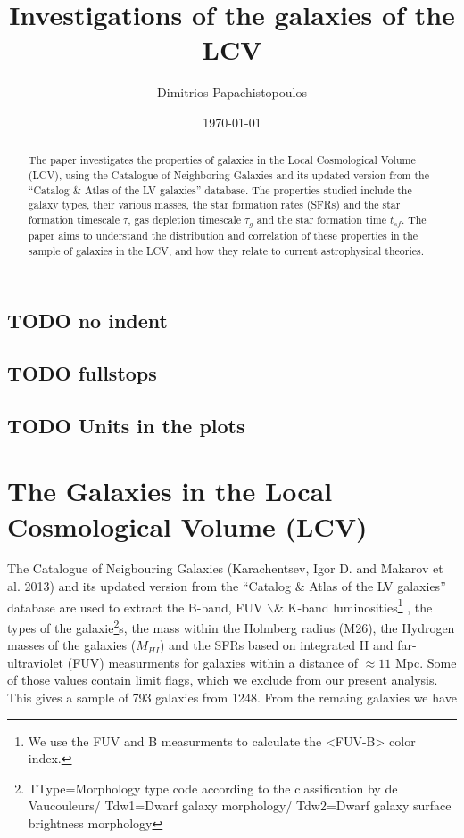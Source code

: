 \documentclass[a4paper,twocolumn]{article}
\author{Dimitrios Papachistopoulos}
\date{\today}
\title{Investigations of the galaxies of the LCV}
\begin{document}
\maketitle

\subsection{{\bfseries\sffamily TODO} no indent}
\label{sec:org4ae1c6d}
\subsection{{\bfseries\sffamily TODO} fullstops}
\label{sec:orge244364}
\subsection{{\bfseries\sffamily TODO} Units in the plots}
\label{sec:orgaf69437}

\begin{abstract}
The paper investigates the properties of galaxies in the Local Cosmological Volume (LCV), using the Catalogue of Neighboring Galaxies\autocite{karachentsevUPDATEDNEARBYGALAXY2013} and its updated version from the ``Catalog \& Atlas of the LV galaxies'' database\autocite{CatalogLVGalaxies}. The properties studied include the galaxy types, their various masses, the star formation rates (SFRs) and the star formation timescale \(\tau\), gas depletion timescale \(\tau_g\) and the star formation time \(t_{sf}\). The paper aims to understand the distribution and correlation of these properties in the sample of galaxies in the LCV, and how they relate to current astrophysical theories.
\end{abstract}

\section{The Galaxies in the Local Cosmological Volume (LCV)}
\label{sec:org94f634b}

The Catalogue of Neigbouring Galaxies (Karachentsev, Igor D. and Makarov  et al. 2013\autocite{karachentsevUPDATEDNEARBYGALAXY2013}) and its updated version from the ``Catalog \& Atlas of the LV galaxies'' database\autocite{CatalogLVGalaxies}  are used to extract the B-band, FUV $\backslash$& K-band luminosities\footnote{We use the FUV and B measurments to calculate the <FUV-B> color index.} , the types of the galaxie\footnote{TType=Morphology type code according to the classification by de Vaucouleurs/ Tdw1=Dwarf galaxy morphology/ Tdw2=Dwarf galaxy surface brightness morphology}s, the mass within the Holmberg radius (M26), the Hydrogen masses of the galaxies (\(M_{HI}\)) and the SFRs based on integrated  H and far-ultraviolet (FUV) measurments for galaxies within a distance of \(\approx 11\) Mpc. Some of those values contain limit flags, which we exclude from our present analysis. This gives a sample of 793 galaxies from 1248. From the remaing galaxies we have
\end{document}
